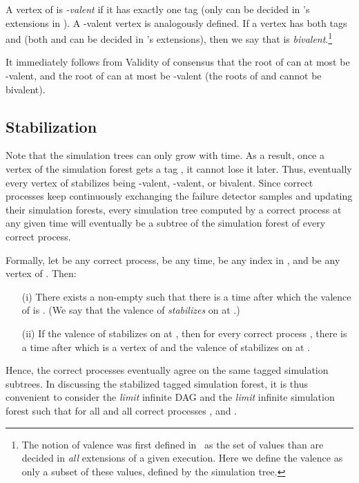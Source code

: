 \documentclass[11pt]{article}
\def\fd{failure detector}
\begin{document}
A vertex  of  is \emph{-valent} if it has exactly one tag 
	(only  can be decided in 's extensions in ).
A -valent vertex is analogously defined.
If a vertex  has both tags  and  (both  and  can be decided
	in 's extensions), then we say that  is \emph{bivalent}.\footnote{
		The notion of valence was first defined in~\cite{FLP85} as
		the set of values than are decided in
		\emph{all} extensions of a given execution.
		Here we define the valence as only a subset of these values,
		defined by the simulation tree.}

It immediately follows from Validity of consensus that
	the root of  can at most be -valent,
	and the root of  can at most be -valent
	(the roots of  and  cannot
	be bivalent).


\subsection{Stabilization}
\label{subsec:cht:stabilization}


Note that the simulation trees can only grow with time.
As a result, once a vertex of the simulation forest  gets a tag , it
	cannot lose it later.
Thus, eventually every vertex of  stabilizes being
	-valent, -valent, or bivalent.
Since correct processes keep continuously exchanging the {\fd} samples
	and updating their simulation forests,
	every simulation tree computed by a correct process at any given time
	will eventually be a subtree of the simulation forest of every correct process.

Formally, let  be any correct process,  be any time, 
	be any index in , and  be any vertex of
	. Then:\begin{enumerate}

\item[(i)] There exists a non-empty  such that
	there is a time after which the valence of  is .
	(We say that the valence of  \emph{stabilizes} on  at .)

\item[(ii)] If the valence of  stabilizes on  at , then
	for every correct process , there is a time after
	which  is a vertex of  and
	the valence of  stabilizes on  at .

\end{enumerate}

Hence, the correct processes eventually agree on the same tagged simulation
	subtrees.
In discussing the stabilized tagged simulation forest,
	it is thus convenient to consider the \emph{limit}
	infinite DAG  and the \emph{limit} infinite simulation
	forest 
	such that for all  and all correct processes ,
	 and
	.
\end{document}
